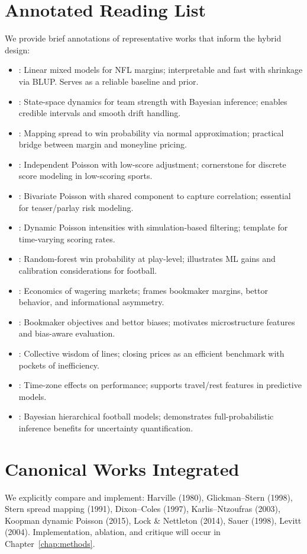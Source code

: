 \section{Annotated Reading List}
We provide brief annotations of representative works that inform the hybrid design:
\begin{itemize}
  \item \citet{harville1980}: Linear mixed models for NFL margins; interpretable and fast with shrinkage via BLUP. Serves as a reliable baseline and prior.
  \item \citet{glickman1998}: State-space dynamics for team strength with Bayesian inference; enables credible intervals and smooth drift handling.
  \item \citet{stern1991}: Mapping spread to win probability via normal approximation; practical bridge between margin and moneyline pricing.
  \item \citet{dixon1997}: Independent Poisson with low-score adjustment; cornerstone for discrete score modeling in low-scoring sports.
  \item \citet{karlis2003}: Bivariate Poisson with shared component to capture correlation; essential for teaser/parlay risk modeling.
  \item \citet{koopman2015}: Dynamic Poisson intensities with simulation-based filtering; template for time-varying scoring rates.
  \item \citet{lock2014}: Random-forest win probability at play-level; illustrates ML gains and calibration considerations for football.
  \item \citet{sauer1998}: Economics of wagering markets; frames bookmaker margins, bettor behavior, and informational asymmetry.
  \item \citet{levitt2004}: Bookmaker objectives and bettor biases; motivates microstructure features and bias-aware evaluation.
  \item \citet{szalkowski2012}: Collective wisdom of lines; closing prices as an efficient benchmark with pockets of inefficiency.
  \item \citet{nichols2014}: Time-zone effects on performance; supports travel/rest features in predictive models.
  \item \citet{baio2010}: Bayesian hierarchical football models; demonstrates full-probabilistic inference benefits for uncertainty quantification.
\end{itemize}

\section{Canonical Works Integrated}
\label{sec:canon}
We explicitly compare and implement: Harville (1980), Glickman–Stern (1998), Stern spread mapping (1991), Dixon–Coles (1997), Karlis–Ntzoufras (2003), Koopman dynamic Poisson (2015), Lock \& Nettleton (2014), Sauer (1998), Levitt (2004).  
Implementation, ablation, and critique will occur in Chapter~\ref{chap:methods}.

